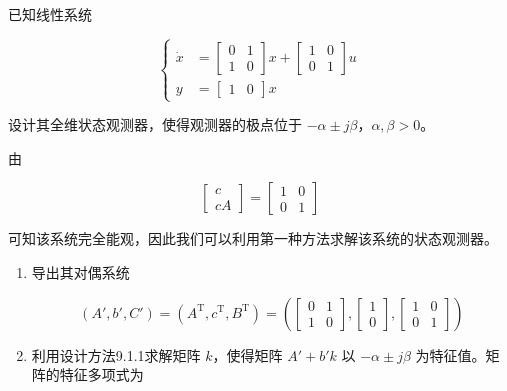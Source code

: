 \begin{example}
    已知线性系统

    \[
    \left\{
    \begin{aligned}
    \dot{x}
    &=
    \begin{bmatrix}
    0 & 1\\
    1 & 0
    \end{bmatrix}x
    +
    \begin{bmatrix}
    1 & 0\\
    0 & 1
    \end{bmatrix}u\\
    y
    &=
    \begin{bmatrix}
    1 & 0
    \end{bmatrix}x
    \end{aligned}
    \right.
    \]

    设计其全维状态观测器，使得观测器的极点位于 $-\alpha\pm j\beta$，$\alpha,\beta>0$。

    由

    \[
    \begin{bmatrix}
    c\\
    cA
    \end{bmatrix}
    =
    \begin{bmatrix}
    1 & 0\\
    0 & 1
    \end{bmatrix}
    \]

    可知该系统完全能观，因此我们可以利用第一种方法求解该系统的状态观测器。

    \begin{enumerate}

        \item 导出其对偶系统

        \[
        (A',b',C')=(A^{\mathrm{T}},c^{\mathrm{T}},B^{\mathrm{T}})
        =
        \left(
        \begin{bmatrix}
        0 & 1\\
        1 & 0
        \end{bmatrix},
        \begin{bmatrix}
        1\\
        0
        \end{bmatrix},
        \begin{bmatrix}
        1 & 0\\
        0 & 1
        \end{bmatrix}
        \right)
        \]

        \item 利用设计方法9.1.1求解矩阵 $k$，使得矩阵 $A'+b'k$ 以 $-\alpha\pm j\beta$ 为特征值。矩阵的特征多项式为


\end{enumerate}
\end{example}
